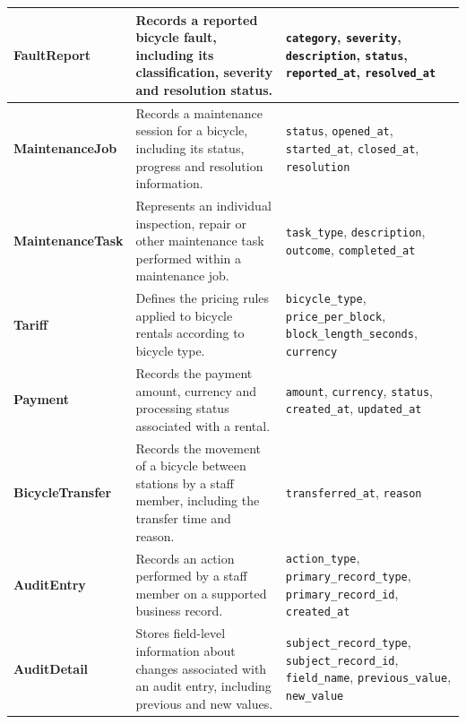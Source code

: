 \documentclass[10pt,a4paper,landscape]{article}
\begin{document}
\begin{longtable}{|L{35mm}|L{75mm}|L{146mm}|}
\textbf{FaultReport} &
Records a reported bicycle fault, including its classification, severity and resolution status. &
\texttt{category}, \texttt{severity}, \texttt{description}, \texttt{status}, \texttt{reported\_at}, \texttt{resolved\_at}\\
\hline

\textbf{MaintenanceJob} &
Records a maintenance session for a bicycle, including its status, progress and resolution information. &
\texttt{status}, \texttt{opened\_at}, \texttt{started\_at}, \texttt{closed\_at}, \texttt{resolution}\\
\hline

\textbf{MaintenanceTask} &
Represents an individual inspection, repair or other maintenance task performed within a maintenance job. &
\texttt{task\_type}, \texttt{description}, \texttt{outcome}, \texttt{completed\_at}\\
\hline

\textbf{Tariff} &
Defines the pricing rules applied to bicycle rentals according to bicycle type. &
\texttt{bicycle\_type}, \texttt{price\_per\_block}, \texttt{block\_length\_seconds}, \texttt{currency}\\
\hline

\textbf{Payment} &
Records the payment amount, currency and processing status associated with a rental. &
\texttt{amount}, \texttt{currency}, \texttt{status}, \texttt{created\_at}, \texttt{updated\_at}\\
\hline

\textbf{BicycleTransfer} &
Records the movement of a bicycle between stations by a staff member, including the transfer time and reason. &
\texttt{transferred\_at}, \texttt{reason}\\
\hline

\textbf{AuditEntry} &
Records an action performed by a staff member on a supported business record. &
\texttt{action\_type}, \texttt{primary\_record\_type}, \texttt{primary\_record\_id}, \texttt{created\_at}\\
\hline

\textbf{AuditDetail} &
Stores field-level information about changes associated with an audit entry, including previous and new values. &
\texttt{subject\_record\_type}, \texttt{subject\_record\_id}, \texttt{field\_name}, \texttt{previous\_value}, \texttt{new\_value}\\
\hline

\end{longtable}
\end{document}

